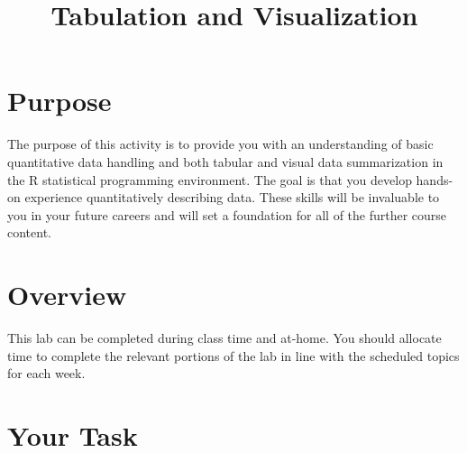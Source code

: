 \documentclass[a4paper,12pt]{article}
\title{Tabulation and Visualization}
\author{}
\date{}
\begin{document}
\vspace{-4em}

\maketitle

\vspace{-4em}

\section{Purpose}

The purpose of this activity is to provide you with an understanding of basic quantitative data handling and both tabular and visual data summarization in the R statistical programming environment. The goal is that you develop hands-on experience quantitatively describing data. These skills will be invaluable to you in your future careers and will set a foundation for all of the further course content.

\section{Overview}

This lab can be completed during class time and at-home. You should allocate time to complete the relevant portions of the lab in line with the scheduled topics for each week.

\section{Your Task}
\end{document}
